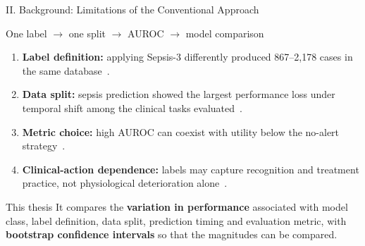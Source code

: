 \begin{frame}{II. Background: Limitations of the Conventional Approach}
\vspace*{0pt}%
{\centering One label $\rightarrow$ one split $\rightarrow$ AUROC
$\rightarrow$ model comparison\par}

\vspace{2pt}
\begin{enumerate}\itemsep1pt\small
  \item \textbf{Label definition:} applying Sepsis-3 differently produced
        867--2,178 cases in the same database~\cite{cohen2024subtle}.
  \item \textbf{Data split:} sepsis prediction showed the largest performance
        loss under temporal shift among the clinical tasks
        evaluated~\cite{guo2022temporal}.
  \item \textbf{Metric choice:} high AUROC can coexist with utility below the
        no-alert strategy~\cite{wang2025srpm}.
  \item \textbf{Clinical-action dependence:} labels may capture recognition and
        treatment practice, not physiological deterioration
        alone~\cite{kamran2024evaluation}.
\end{enumerate}

\vspace{2pt}
\begin{block}{This thesis}
  \small It compares the \textbf{variation in performance} associated with
  model class, label definition, data split, prediction timing and evaluation
  metric, with \textbf{bootstrap confidence intervals} so that the magnitudes
  can be compared.
\end{block}
\end{frame}
